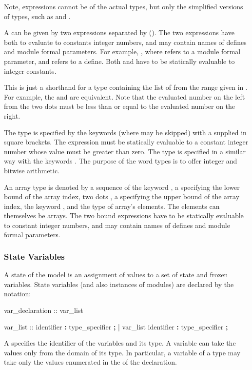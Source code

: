 Note, expressions cannot be of the actual \Enum types, but only the
simplified versions of \Enum types, such as \SymbEnum and \IntSymbEnum.

A  can be given by two expressions
separated by  (). The two
expressions have both to evaluate to constants integer numbers, and
may contain names of defines and module formal parameters. For example,
, where  refers to a module formal 
parameter, and  refers to a define. Both  and 
 have to be statically evaluable to integer constants.

This is just a shorthand for a \Enum type containing the list
of  from the range given in .
%
For example, the   and
 are equivalent. 
%
Note that the evaluated number on the left from the two dots must
be less than or equal to the evaluated number on the right.

The \UWord type is specified by the keywords 
(where  may be skipped) with a  
supplied in square brackets.
%
The expression must be statically evaluable to a constant integer
number whose value must be greater than zero. 
%
The \SWord type is specified in a similar way with the keywords
.
%
The purpose of the word types is to offer integer and bitwise
arithmetic.


An array type is denoted by a sequence of the keyword
, a  specifying the lower
bound of the array index, two dots , a
 specifying the upper bound of the array
index, the keyword , and the type of array's
elements. The elements can themselves be arrays. The two bound
expressions have to be statically evaluable to constant integer
numbers, and may contain names of defines and module formal
parameters.


\subsubsection{State Variables}
\label{State Variables}
%
A state of the model is an assignment of values to a set of state
and frozen variables. 
%
State variables (and also instances of modules) are declared by the
notation:
%
\begin{Grammar}
var_declaration ::  var_list

var_list :: identifier \textbf{:} type_specifier \textbf{;}
          | var_list identifier \textbf{:} type_specifier \textbf{;}
\end{Grammar}
%
A  specifies the identifier of the
variables and its type. 
%
A variable can take the values only from the domain of its type. In
particular, a variable of a \Enum type may take only the values
enumerated in the  of the declaration.

